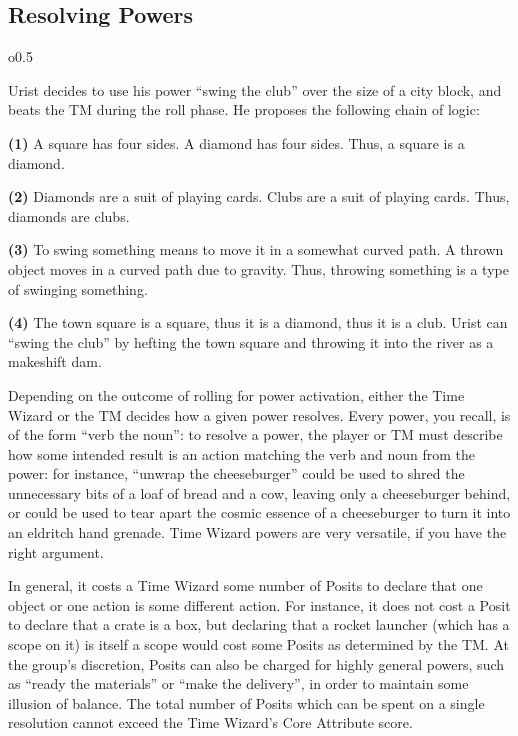 \documentclass[twoside]{article}
\newenvironment{examplebox}[1]{\begin{tcolorbox}[colback=green!5!white,colframe=green!75!black,title={Example: #1}]}{\end{tcolorbox}\vspace{-30pt}}
\begin{document}
\subsection{Resolving Powers} \label{ssec:resolve-power}
\begin{wrapfigure}{o}{0.5\textwidth}
   \begin{examplebox}{Power Resolution}
      Urist decides to use his power ``swing the club'' over the size of a city block, and beats
      the TM during the roll phase. He proposes the following chain of logic:

      \textbf{(1)}
         A square has four sides. A diamond has four sides. Thus, a square is a diamond.
      
      \textbf{(2)}
         Diamonds are a suit of playing cards. Clubs are a suit of playing cards. Thus, diamonds 
         are clubs.
      
      \textbf{(3)}
         To swing something means to move it in a somewhat curved path. A thrown object moves in 
         a curved path due to gravity. Thus, throwing something is a type of swinging something.

      \textbf{(4)}
         The town square is a square, thus it is a diamond, thus it is a club. Urist can
         ``swing the club'' by hefting the town square and throwing it into the river as a
         makeshift dam.
   \end{examplebox}
\end{wrapfigure}

Depending on the outcome of rolling for power activation, either the Time Wizard or the TM
decides how a given power resolves. Every power, you recall, is of the form ``verb the noun'':
to resolve a power, the player or TM must describe how some intended result is an action
matching the verb and noun from the power: for instance, ``unwrap the cheeseburger'' could be
used to shred the unnecessary bits of a loaf of bread and a cow, leaving only a cheeseburger
behind, or could be used to tear apart the cosmic essence of a cheeseburger to turn it into
an eldritch hand grenade. Time Wizard powers are very versatile, if you have the right argument.

In general, it costs a Time Wizard some number of Posits to declare that one object or one
action is some different action. For instance, it does not cost a Posit to declare that a crate
is a box, but declaring that a rocket launcher (which has a scope on it) is itself a scope would
cost some Posits as determined by the TM. At the group's discretion, Posits can also be charged
for highly general powers, such as ``ready the materials'' or ``make the delivery'', in order to
maintain some illusion of balance. The total number of Posits which can be spent on a single
resolution cannot exceed the Time Wizard's Core Attribute score.
\end{document}
